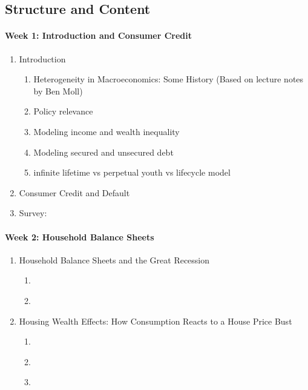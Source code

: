 \documentclass[a4paper,11pt]{article}
\begin{document}
\subsection*{Structure and Content}

\paragraph{Week 1: Introduction and Consumer Credit}
\begin{enumerate}
\item Introduction
  \begin{enumerate}
  \item Heterogeneity in Macroeconomics: Some History (Based on lecture notes by Ben Moll)
  \item Policy relevance
  \item Modeling income and wealth inequality
  \item Modeling secured and unsecured debt
  \item infinite lifetime vs perpetual youth vs lifecycle model
  \end{enumerate}

\item Consumer Credit and Default \citep{athreya2002welfare,chatterjee2007quantitative,livshits2007consumer}
\item Survey: \citet{exler2020consumer}
\end{enumerate}

\paragraph{Week 2: Household Balance Sheets}

\begin{enumerate}
\item Household Balance Sheets and the Great Recession
  \begin{enumerate}
  \item \cite{mian2013household}
  \item \cite{berger2015consumption}
  \end{enumerate}
\item Housing Wealth Effects: How Consumption Reacts to a House Price Bust
  \begin{enumerate}
  \item \cite{berger2018house}
  \item \cite{guren2021housing}
  \item \cite{greimel2019understanding}
  \end{enumerate}
\end{enumerate}
\end{document}
